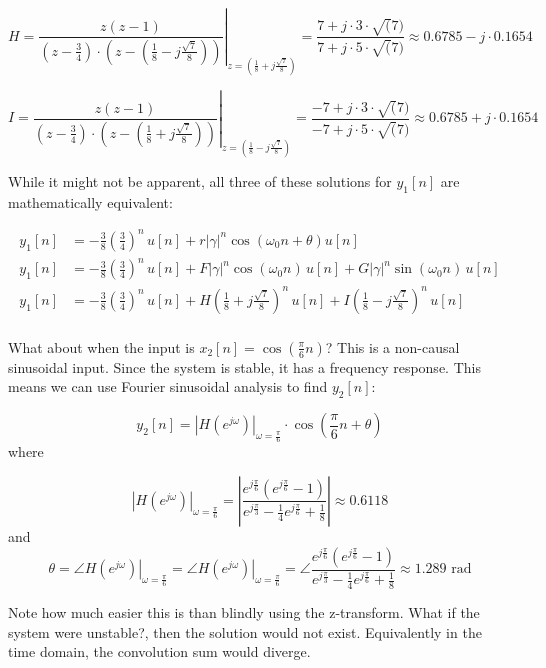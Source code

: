 \documentclass{article}
\begin{document}
\[
H = \left. \frac{z(z-1)}{\left(z-\frac{3}{4}\right)\cdot \left(z-\left(\frac{1}{8} - j \frac{\sqrt{7}}{8}\right)\right)} \right|_{z=\left(\frac{1}{8} + j \frac{\sqrt{7}}{8}\right)} = \frac{7 + j\cdot 3\cdot\sqrt(7)}{7 + j\cdot 5\cdot\sqrt(7)} \approx 0.6785 - j\cdot 0.1654
\]

\[
I = \left. \frac{z(z-1)}{\left(z-\frac{3}{4}\right)\cdot \left(z-\left(\frac{1}{8} + j \frac{\sqrt{7}}{8}\right)\right)} \right|_{z=\left(\frac{1}{8} - j \frac{\sqrt{7}}{8}\right)} = \frac{-7 + j\cdot 3\cdot\sqrt(7)}{-7 + j\cdot 5\cdot\sqrt(7)} \approx 0.6785 + j\cdot 0.1654
\]

While it might not be apparent, all three of these solutions for $y_1[n]$ are mathematically equivalent:

\begin{align*}
  y_1[n] &= -\frac{3}{8}\left( \frac{3}{4}\right)^n\, u[n] + r |\gamma|^n \cos(\omega_0 n + \theta) u[n]\\
  y_1[n] &= -\frac{3}{8}\left( \frac{3}{4}\right)^n\, u[n] + F|\gamma|^n\cos(\omega_0 n)\, u[n] +  G|\gamma|^n\sin(\omega_0 n)\, u[n]\\
  y_1[n] &= -\frac{3}{8}\left( \frac{3}{4}\right)^n\, u[n] + H\left(\frac{1}{8} + j \frac{\sqrt{7}}{8}\right)^n\, u[n] + I \left(\frac{1}{8} - j \frac{\sqrt{7}}{8}\right)^n\, u[n] \\
\end{align*}

What about when the input is $x_2[n] = \cos\left( \frac{\pi}{6}n\right)$? This is a non-causal sinusoidal input. Since the system is stable, it has a frequency response. This means we can use Fourier sinusoidal analysis to find $y_2[n]$:

\[
y_2[n] = \left| H\left( e^{j\omega} \right) \right|_{\omega = \frac{\pi}{6}} \cdot \cos\left( \frac{\pi}{6}n + \theta\right) 
\]
where

\[
\left| H\left( e^{j\omega} \right) \right|_{\omega = \frac{\pi}{6}} = \left| \frac{e^{j\frac{\pi}{6}}\left(e^{j\frac{\pi}{6}} - 1\right)}{e^{j\frac{\pi}{3}} - \frac{1}{4}e^{j\frac{\pi}{6}}+ \frac{1}{8}}\right| \approx 0.6118
\]
and
\[
\theta = \left. \angle H\left( e^{j\omega} \right) \right|_{\omega = \frac{\pi}{6}} = \left. \angle H\left( e^{j\omega} \right) \right|_{\omega = \frac{\pi}{6}} = \angle \frac{e^{j\frac{\pi}{6}}\left(e^{j\frac{\pi}{6}} - 1\right)}{e^{j\frac{\pi}{3}} - \frac{1}{4}e^{j\frac{\pi}{6}} + \frac{1}{8}}  \approx 1.289 \mbox{ rad}
\]

Note how much easier this is than blindly using the z-transform. What if the system were unstable?, then the solution would not exist. Equivalently in the time domain, the convolution sum would diverge.
\end{document}
